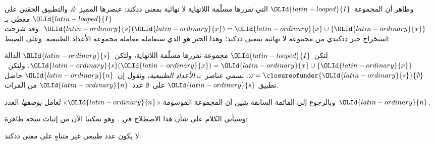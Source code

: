 \documentclass[../../../include/open-logic-section]{subfiles}
\begin{document}
وظاهر أن المجموعة~${\OLId{latin-looped}{I}}$ التي تقررها مسلّمة اللانهاية لا نهائية بمعنى
ددكند: عنصرها المميز~$\emptyset$، والتطبيق الحقني على
${\OLId{latin-looped}{I}}$ معطى بـ${\OLId{latin-ordinary}{s}}({\OLId{latin-ordinary}{x}}) = {\OLId{latin-ordinary}{x}}\cup\{{\OLId{latin-ordinary}{x}}\}$. وقد شرحت
 استخراج
جبر ددكندي من مجموعة لا نهائية بمعنى ددكند؛ وهذا الجبر هو الذي سنعامله
معاملة مجموعة الأعداد الطبيعية. وعلى الضبط:
\begin{defn}
لتكن~${\OLId{latin-looped}{I}}$ مجموعة تقررها مسلّمة اللانهاية، ولتكن~${\OLId{latin-ordinary}{s}}$ الدالة
${\OLId{latin-ordinary}{s}}({\OLId{latin-ordinary}{x}}) = {\OLId{latin-ordinary}{x}} \cup \{{\OLId{latin-ordinary}{x}}\}$. ولتكن~$\omega = \closureofunder{{\OLId{latin-ordinary}{s}}}{\emptyset}$.
نسمي عناصر~$\omega$ \emph{الأعداد الطبيعية}، ونقول إن~${\OLId{latin-ordinary}{n}}$ حاصل تطبيق
${\OLId{latin-ordinary}{s}}$ على~$\emptyset$ عدد~${\OLId{latin-ordinary}{n}}$ من المرات.
\end{defn}

وبالرجوع إلى القائمة السابقة يتبين أن المجموعة الموسومة «${\OLId{latin-ordinary}{n}}$» تُعامل
\emph{بوصفها} العدد~${\OLId{latin-ordinary}{n}}$.

وسيأتي الكلام على شأن هذا الاصطلاح في~. وهو
يمكننا الآن من إثبات نتيجة ظاهرة:

\begin{prop}
لا يكون عدد طبيعي غير متناهٍ على معنى ددكند.
\end{prop}
\end{document}
